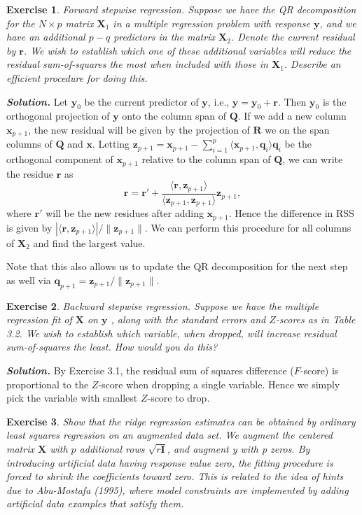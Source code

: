 \documentclass[12pt]{article}
\def\bQ{\textbf{Q}}
\def\bx{\textbf{x}}
\def\bz{\textbf{z}}
\def\bX{\textbf{X}}
\def\by{\textbf{y}}
\def\br{\textbf{r}}
\def\bR{\textbf{R}}
\def\bQ{\textbf{Q}}
\def\bq{\textbf{q}}
\newtheorem{exercise}{Exercise}[section]
\newenvironment{solution}[1][\it{Solution}]{\textbf{#1. } }{\vspace{.5cm}}
\begin{document}
\begin{exercise}
    Forward stepwise regression. Suppose we have the QR decomposition for the $N \times p$ matrix $\bX_1$ in a multiple regression problem with response $\by$, and we have an additional $p-q$ predictors in the matrix 
$\bX_2$. Denote the current residual by $\br$. We wish to establish which one of these additional variables will reduce the residual sum-of-squares the most when included with those in 
$\bX_1$. Describe an efficient procedure for doing this.
\end{exercise}
\begin{solution}
Let $\by_0$ be the current predictor of $\by$, i.e., $\by = \by_0 + \br$. Then $\by_0$ is the orthogonal projection of $\by$ onto the column span of $\bQ$. If we add a new column $\bx_{p+1}$, the new residual will be given by the projection of $\bR$ we on the span columns of $\bQ$ and $\bx$.  Letting $\bz_{p+1}= \bx_{p+1} - \sum_{i=1}^p \langle \bx_{p+1}, \bq_i \rangle \bq_i$ be the orthogonal component of $\bx_{p+1}$ relative to the column span of $\bQ$, we can write the residue $\br$ as 
$$\br = \br' + \frac{\langle \br, \bz_{p+1}\rangle}{\langle \bz_{p+1}, \bz_{p+1}\rangle} \bz_{p+1},$$
where $\br'$ will be the new residues after adding $\bx_{p+1}$. Hence the difference in RSS is given by $|\langle \br, \bz_{p+1} \rangle |/\|\bz_{p+1}\|$. We can perform this procedure for all columns of $\bX_2$ and find the largest value. 

Note that this also allows us to update the QR decomposition for the next step as well via $\bq_{p+1} = \bz_{p+1}/\|\bz_{p+1}\|$.
\end{solution}

\begin{exercise} Backward stepwise regression. Suppose we have the multiple regression fit of 
$\bX$ on $\by$ , along with the standard errors and $Z$-scores as in Table 3.2. We wish to establish which variable, when dropped, will increase residual sum-of-squares the least. How would you do this?
\end{exercise}
\begin{solution}
    By Exercise 3.1, the residual sum of squares difference ($F$-score) is proportional to the $Z$-score when dropping a single variable. Hence we simply pick the variable with smallest $Z$-score to drop.
\end{solution}

\begin{exercise} Show that the ridge regression estimates can be obtained by ordinary least squares regression on an augmented data set. We augment
the centered matrix $\bX$ with $p$ additional rows $\sqrt{r\mathbf{I}}$, and augment y with p
zeros. By introducing artificial data having response value zero, the fitting
procedure is forced to shrink the coefficients toward zero. This is related to
the idea of hints due to Abu-Mostafa (1995), where model constraints are
implemented by adding artificial data examples that satisfy them.
\end{exercise}
\end{document}
